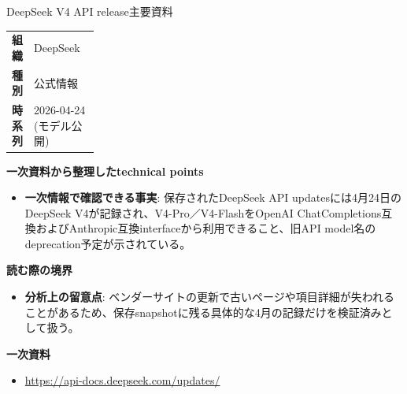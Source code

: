 \begin{technicalnote}{DeepSeek V4 API release}{主要資料}
\begingroup
\begin{tabularx}{\linewidth}{@{}>{\bfseries}p{0.22\linewidth}X@{}}
組織 & DeepSeek \\
種別 & 公式情報 \\
時系列 & 2026-04-24 (モデル公開) \\
\end{tabularx}
\smallskip
{\bfseries 一次資料から整理したtechnical points}
\begin{itemize}[leftmargin=1.5em,itemsep=0.35em]
\item \textbf{一次情報で確認できる事実}: 保存されたDeepSeek API updatesには4月24日のDeepSeek V4が記録され、V4-Pro／V4-FlashをOpenAI ChatCompletions互換およびAnthropic互換interfaceから利用できること、旧API model名のdeprecation予定が示されている。
\end{itemize}
{\bfseries 読む際の境界}
\begin{itemize}[leftmargin=1.5em,itemsep=0.35em]
\item \textbf{分析上の留意点}: ベンダーサイトの更新で古いページや項目詳細が失われることがあるため、保存snapshotに残る具体的な4月の記録だけを検証済みとして扱う。
\end{itemize}
\begin{samepage}
{\bfseries 一次資料}
\begingroup\sloppy
\begin{itemize}[leftmargin=1.5em,itemsep=0.25em]
\item {\scriptsize\url{https://api-docs.deepseek.com/updates/}}
\end{itemize}
\endgroup
\end{samepage}
\endgroup
\end{technicalnote}
\medskip

